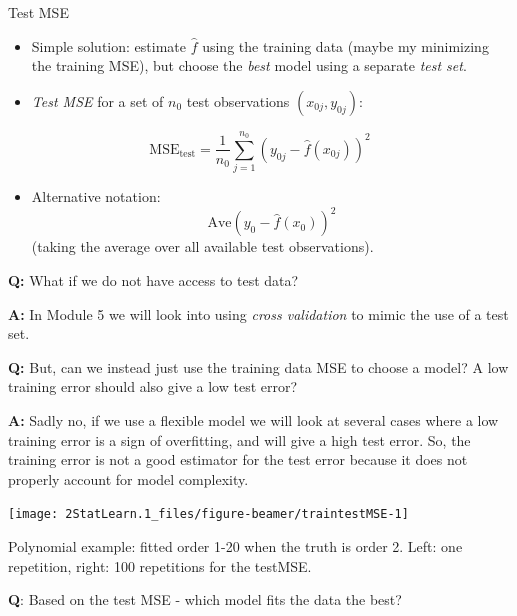 \documentclass[ignorenonframetext,]{beamer}
\providecommand{\tightlist}{%
  \setlength{\itemsep}{0pt}\setlength{\parskip}{0pt}}
\begin{document}
\begin{frame}

\begin{block}{Test MSE}

\begin{itemize}
\item
  Simple solution: estimate \(\hat{f}\) using the training data (maybe
  my minimizing the training MSE), but choose the \emph{best} model
  using a separate \emph{test set}.
\item
  \emph{Test MSE} for a set of \(n_0\) test observations
  \((x_{0j},y_{0j})\):
\end{itemize}

\[ \text{MSE}_{\text{test}}=\frac{1}{n_0}\sum_{j=1}^{n_0} (y_{0j}-\hat{f}(x_{0j}))^2\]

\begin{itemize}
\tightlist
\item
  Alternative notation: \[\text{Ave}(y_0-\hat{f}(x_0))^2\] (taking the
  average over all available test observations).
\end{itemize}

\end{block}

\end{frame}

\begin{frame}

\textbf{Q:} What if we do not have access to test data?

\textbf{A:} In Module 5 we will look into using \emph{cross validation}
to mimic the use of a test set.

\textbf{Q:} But, can we instead just use the training data MSE to choose
a model? A low training error should also give a low test error?

\textbf{A:} Sadly no, if we use a flexible model we will look at several
cases where a low training error is a sign of overfitting, and will give
a high test error. So, the training error is not a good estimator for
the test error because it does not properly account for model
complexity.

\end{frame}

\begin{frame}

\begin{center}\texttt{[image: 2StatLearn.1\_files/figure-beamer/traintestMSE-1]} \end{center}

Polynomial example: fitted order 1-20 when the truth is order 2. Left:
one repetition, right: 100 repetitions for the testMSE.

\textbf{Q}: Based on the test MSE - which model fits the data the best?

\end{frame}
\end{document}
